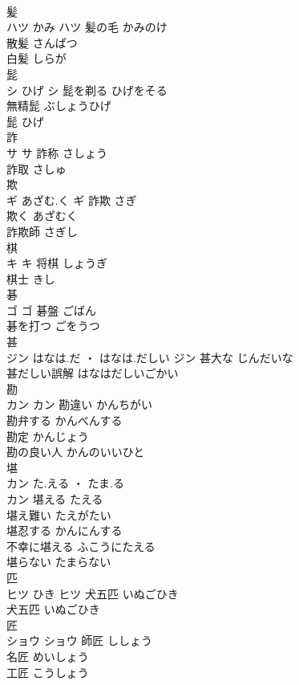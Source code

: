 \documentclass[8pt]{extreport}
\begin{document}
\begin{CJK}{UTF8}{min}
\\	髪	
\\	ハツ	かみ	ハツ	髪の毛	かみのけ	
\\	散髪	さんぱつ	
\\	白髪	しらが	
\\	髭	
\\	シ	ひげ	シ	髭を剃る	ひげをそる	
\\	無精髭	ぶしょうひげ	
\\	髭	ひげ	
\\	詐	
\\	サ		サ													詐称	さしょう	
\\	詐取	さしゅ	
\\	欺	
\\	ギ	あざむ.く	ギ	詐欺	さぎ	
\\	欺く	あざむく	
\\	詐欺師	さぎし	
\\	棋	
\\	キ		キ	将棋	しょうぎ	
\\	棋士	きし	
\\	碁	
\\	ゴ		ゴ	碁盤	ごばん	
\\	碁を打つ	ごをうつ	
\\	甚	
\\	ジン	はなは.だ ・ はなは.だしい	ジン	甚大な	じんだいな	
\\	甚だしい誤解	はなはだしいごかい	
\\	勘	
\\	カン		カン	勘違い	かんちがい	
\\	勘弁する	かんべんする	
\\	勘定	かんじょう	
\\	勘の良い人	かんのいいひと	
\\	堪	
\\	カン	た.える ・ たま.る
\\	カン	堪える	たえる	
\\	堪え難い	たえがたい	
\\	堪忍する	かんにんする	
\\	不幸に堪える	ふこうにたえる	
\\	堪らない	たまらない	
\\	匹	
\\	ヒツ	ひき	ヒツ	犬五匹	いぬごひき	
\\	犬五匹	いぬごひき	
\\	匠	
\\	ショウ		ショウ	師匠	ししょう	
\\	名匠	めいしょう	
\\	工匠	こうしょう	

\end{CJK}
\end{document}
